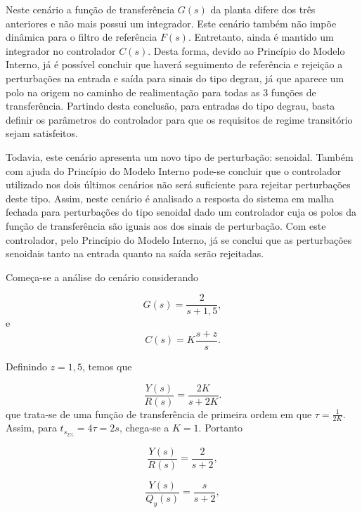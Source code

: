Neste cenário a função de transferência $G(s)$ da planta difere dos três
anteriores e não mais possui um integrador. Este cenário também não impõe
dinâmica para o filtro de referência $F(s)$. Entretanto, ainda é mantido um
integrador no controlador $C(s)$. Desta forma, devido ao Princípio do Modelo
Interno, já é possível concluir que haverá seguimento de referência e rejeição a
perturbações na entrada e saída para sinais do tipo degrau, já que aparece um
polo na origem no caminho de realimentação para todas as 3 funções de
transferência. Partindo desta conclusão, para entradas do tipo degrau, basta
definir os parâmetros do controlador para que os requisitos de regime
transitório sejam satisfeitos.

Todavia, este cenário apresenta um novo tipo de perturbação: senoidal. Também
com ajuda do Princípio do Modelo Interno pode-se concluir que o controlador
utilizado nos dois últimos cenários não será suficiente para rejeitar
perturbações deste tipo. Assim, neste cenário é analisado a resposta do sistema
em malha fechada para perturbações do tipo senoidal dado um controlador cuja os
polos da função de transferência são iguais aos dos sinais de perturbação. Com
este controlador, pelo Princípio do Modelo Interno, já se conclui que as
perturbações senoidais tanto na entrada quanto na saída serão rejeitadas.

Começa-se a análise do cenário considerando

\begin{equation}
    \label{eq:gdes-cenario4}
    G(s) = \frac{2}{s + 1,5}, 
\end{equation}
e
\begin{equation}
    \label{eq:cdes-cenario4}
    C(s) = K\frac{s + z}{s}.
\end{equation}

Definindo $z = 1,5$, temos que

\begin{equation}
    \label{eq:y2r-comk-cenario4}
    \frac{Y(s)}{R(s)} = \frac{2K}{s + 2K}.
\end{equation}
que trata-se de uma função de transferência de primeira ordem em que $\tau =
\frac{1}{2K}$. Assim, para $t_{s_{2\%}} = 4\tau = 2s$, chega-se a $K = 1$.
Portanto

\begin{equation}
    \label{eq:y2r-solucionado-cenario4-a-b}
    \frac{Y(s)}{R(s)} = \frac{2}{s + 2},
\end{equation}

\begin{equation}
    \label{eq:y2qy-solucionado-cenario4-a-b}
    \frac{Y(s)}{Q_{y}(s)} = \frac{s}{s + 2},
\end{equation}

